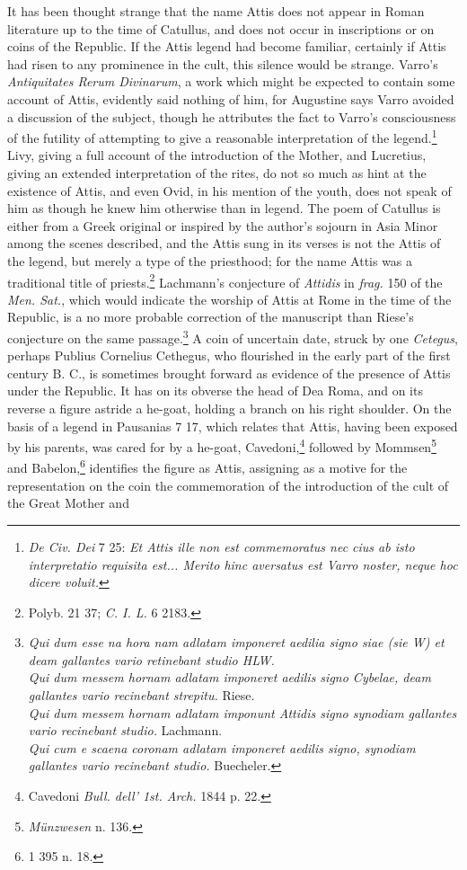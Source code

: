 \documentclass[a4paper, 11pt, oneside, polutonikogreek, english]{article}
\begin{document}
It has been thought strange that the name Attis does not appear in Roman literature up to the time of Catullus, and does not occur in inscriptions or on coins of the Republic. If the Attis legend had become familiar, certainly if Attis had risen to any prominence in the cult, this silence would be strange. Varro's \emph{Antiquitates Rerum Divinarum}, a work which might be expected to contain some account of Attis, evidently said nothing of him, for Augustine says Varro avoided a discussion of the subject, though he attributes the fact to Varro's consciousness of the futility of attempting to give a reasonable interpretation of the legend.\footnote{\emph{De Civ. Dei} 7 25: \emph{Et Attis ille non est commemoratus nec cius ab isto interpretatio requisita est... Merito hinc aversatus est Varro noster, neque hoc dicere voluit.}} Livy, giving a full account of the introduction of the Mother, and Lucretius, giving an extended interpretation of the rites, do not so much as hint at the existence of Attis, and even Ovid, in his mention of the youth, does not speak of him as though he knew him otherwise than in legend. The poem of Catullus is either from a Greek original or inspired by the author's sojourn in Asia Minor among the scenes described, and the Attis sung in its verses is not the Attis of the legend, but merely a type of the priesthood; for the name Attis was a traditional title of priests.\footnote{Polyb. 21 37; \emph{C. I. L.} 6 2183.} Lachmann's conjecture of \emph{Attidis} in \emph{frag.} 150 of the \emph{Men. Sat.}, which would indicate the worship of Attis at Rome in the time of the Republic, is a no more probable correction of the manuscript than Riese's conjecture on the same passage.\footnote{\emph{Qui dum esse na hora nam adlatam imponeret aedilia signo siae (sie W) et deam gallantes vario retinebant studio HLW.}\\\hspace*{10mm}\emph{Qui dum messem hornam adlatam imponeret aedilis signo Cybelae, deam gallantes vario recinebant strepitu.} Riese.\\\hspace*{10mm}\emph{Qui dum messem hornam adlatam imponunt Attidis signo synodiam gallantes vario recinebant studio.} Lachmann.\\\hspace*{10mm}\emph{Qui cum e scaena coronam adlatam imponeret aedilis signo, synodiam gallantes vario recinebant studio.} Buecheler.} A coin of uncertain date, struck by one \emph{Cetegus}, perhaps Publius Cornelius Cethegus, who flourished in the early part of the first century B. C., is sometimes brought forward as evidence of the presence of Attis under the Republic. It has on its obverse the head of Dea Roma, and on its reverse a figure astride a he-goat, holding a branch on his right shoulder. On the basis of a legend in Pausanias 7 17, which relates that Attis, having been exposed by his parents, was cared for by a he-goat, Cavedoni,\footnote{Cavedoni \emph{Bull. dell' 1st. Arch.} 1844 p. 22.} followed by Mommsen\footnote{\emph{Münzwesen} n. 136.} and Babelon,\footnote{1 395 n. 18.} identifies the figure as Attis, assigning as a motive for the representation on the coin the commemoration of the introduction of the cult of the Great Mother and 
\end{document}
